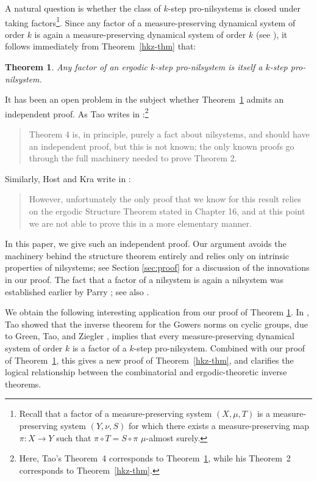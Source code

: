 \documentclass[12pt]{amsart}
\theoremstyle{plain}
\newtheorem{theorem}{Theorem}[section]
\theoremstyle{definition}
\begin{document}
A natural question is whether the class of $k$-step pro-nilsystems is closed
under taking factors\footnote{Recall that a factor of a measure-preserving system $(X,\mu,T)$ is a
measure-preserving system $(Y,\nu,S)$ for which there exists a
measure-preserving map $\pi\colon X \to Y$ such that $\pi \circ T = S \circ \pi$ $\mu$-almost surely.}. Since any factor of a measure-preserving dynamical system of order $k$ is again a
measure-preserving dynamical system of order $k$ (see
\cite[Proposition~17, Chapter~9]{hk-book}), it follows immediately from
Theorem~\ref{hkz-thm} that:

\begin{theorem}\label{thm-main}
Any factor of an ergodic $k$-step pro-nilsystem is itself a $k$-step
pro-nilsystem.
\end{theorem}

It has been an open problem in the subject whether
Theorem~\ref{thm-main} admits an independent proof. As Tao writes in
\cite{tao-weak}:\footnote{Here, Tao's Theorem~4 corresponds to
Theorem~\ref{thm-main}, while his Theorem~2 corresponds to
Theorem~\ref{hkz-thm}.}
\begin{quote}
Theorem 4 is, in principle, purely a fact about nilsystems, and should have an
independent proof, but this is not known; the only known proofs go through the
full machinery needed to prove Theorem 2.
\end{quote}
Similarly, Host and Kra write in \cite[p.~221]{hk-book}:
\begin{quote}
However, unfortunately the only proof that we know for this result relies on the ergodic Structure Theorem stated in Chapter 16,
and at this point we are not able to prove this in a more elementary manner.
\end{quote}

In this paper, we give such an independent proof. Our argument avoids the
machinery behind the structure theorem entirely and relies only on intrinsic
properties of nilsystems; see Section \ref{sec:proof} for a discussion of the innovations in our proof.
The fact that a factor of a nilsystem is again a
nilsystem was established earlier by Parry \cite{parry}; see also
\cite{lesigne,leibman}.

We obtain the following interesting application from our proof of Theorem \ref{thm-main}. 
In \cite{tao-weak}, Tao showed that the inverse theorem for the Gowers norms on
cyclic groups, due to Green, Tao, and Ziegler \cite{gtz},
implies that every measure-preserving dynamical system of order $k$ is a factor
of a $k$-step pro-nilsystem. Combined with our proof of
Theorem~\ref{thm-main}, this gives a new proof of Theorem~\ref{hkz-thm}, and
clarifies the logical relationship between the combinatorial and
ergodic-theoretic inverse theorems.
\end{document}
